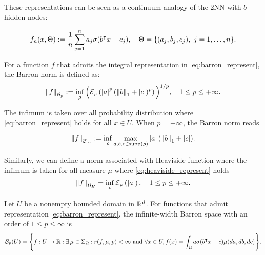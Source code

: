 These representations can be seen as a continuum analogy of the 2NN with $b$
hidden nodes:

\begin{equation}
    f_n(x, \Theta) := \frac{1}{n}
    \sum_{j=1}^n a_j 
        \sigma(b{}^{\intercal} x + c_j), 
    \quad \Theta = \{(a_j, b_j, c_j), \ j = 1, \dots, n\}.
\end{equation}

\begin{definition} For a function $f$ that admits the integral
    representation in \eqref{eq:barron_represent}, the Barron norm is defined as:
    \begin{equation}\label{eq:barron_norm}
        \barronnorm{f}{p} := \inf_{\rho} \Big(\ERWi{\mu}{\abs{a}^p 
        (\norm{b}_1 + \abs{c})^p}\Big)^{1/p},
        \quad 1 \leq p \leq +\infty.
    \end{equation}
\end{definition}

The infimum is taken over all probability distribution where
\eqref{eq:barron_represent} holds for all $x \in U$. When $p = + \infty$, the
Barron norm reads

\begin{equation}
    \label{eq:barron_infinite_norm}
    \left\| {f} \right\|_{\mathcal{B}_{\infty}} :=
    \inf_{\rho} \max_{a, b, c \in \operatorname*{supp}(\rho)} \left| a \right| (\left\| b \right\|_1 + \left| c \right|).
\end{equation}

Similarly, we can define a norm associated with Heaviside function where the
infimum is taken for all measure $\mu$ where \eqref{eq:heaviside_represent}
holds
\begin{equation}
    \label{def:heaviside_norm}
    \norm{f}_{\mcal{B}_H} = \inf_{\rho} \ERWi{\mu}{\abs{a}},
    \quad 1 \leq p \leq +\infty.
\end{equation}

\begin{definition}
    \label{def:barron_space}
    Let $U$ be a nonempty bounded domain in $\mathbb{R}^d$. For functions that admit
    representation \eqref{eq:barron_represent}, the infinite-width Barron space
    with an order of $1 \leq p \leq \infty$ is
    \begin{equation}
        \mathcal{B}_p(U) = \Bigg\{
            f: U \to \mathbb{R} : \exists\, \mu \in \Sigma_{\Omega}: 
            r(f, \mu, p) < \infty \textnormal{ and }
            \forall x \in U, f(x) = \int_{\Omega} a \sigma(b{}^{\intercal} x + c) \mu(da, db, dc)
        \Bigg\}.
    \end{equation}
\end{definition}


